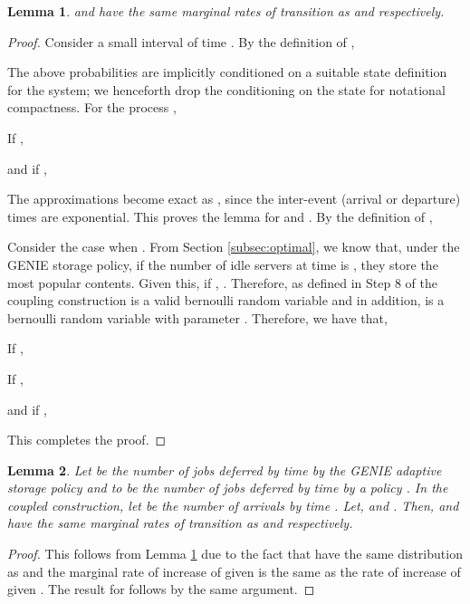 \documentclass[10pt, conference, letterpaper]{IEEEtran}
\newtheorem{lemma}{Lemma}
\begin{document}
\begin{lemma}
	\label{lemma:marginals}
	 and  have the same marginal rates of transition as  and  respectively.
\end{lemma}
\begin{proof}
	Consider a small interval of time . By the definition of ,
	
	The above probabilities are implicitly conditioned on a suitable state definition for the system; we henceforth drop the conditioning on the state for notational compactness. For the process ,
	
	If ,
	
	and if ,
	
	The approximations become exact as , since the inter-event (arrival or departure) times are exponential. This proves the lemma for  and .
	\newline \newline By the definition of ,
	
	Consider the case when .
	\newline From Section \ref{subsec:optimal}, we know that, under the GENIE storage policy, if the number of idle servers at time  is , they store the  most popular contents. Given this, if , . Therefore,  as defined in Step 8 of the coupling construction is a valid bernoulli random variable and in addition,  is a bernoulli random variable with parameter . Therefore, we have that,
	
	If ,
	
	If ,
	
	and if ,
	
	This completes the proof.
\end{proof}


\begin{lemma}
	\label{lemma:marginals_2}
	Let  be the number of jobs deferred by time  by the GENIE adaptive storage policy and  to be the number of jobs deferred by time  by a policy . In the coupled construction, let  be the number of arrivals by time . Let,  and . Then,  and  have the same marginal rates of transition as  and  respectively.
\end{lemma}
\begin{proof}
	This follows from Lemma \ref{lemma:marginals} due to the fact that  have the same distribution as  and the marginal rate of increase of  given  is the same as the rate of increase of  given . The result for  follows by the same argument.
\end{proof}
\end{document}

